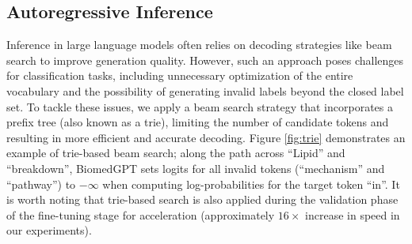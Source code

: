 \documentclass[10pt]{article} \usepackage[preprint]{tmlr}
\begin{document}
\begin{table*}
\centering
\caption{Detailed model configuration of BiomedGPT. During the pretraining phase, image processing involves resizing and cropping the images to varying resolutions, corresponding to the input sizes listed in the table. It should be noted that during fine-tuning and inference stages, the input resolution of BiomedGPT can be flexibly adjusted according to the specific requirements of the task.}
\label{tab:scaling}
\end{table*}



\subsection{Autoregressive Inference} 
Inference in large language models often relies on decoding strategies like beam search to improve generation quality. However, such an approach poses challenges for classification tasks, including unnecessary optimization of the entire vocabulary and the possibility of generating invalid labels beyond the closed label set. To tackle these issues, we apply a beam search strategy that incorporates a prefix tree (also known as a trie), limiting the number of candidate tokens and resulting in more efficient and accurate decoding. Figure \ref{fig:trie} demonstrates an example of trie-based beam search; along the path across ``Lipid'' and ``breakdown'', BiomedGPT sets logits for all invalid tokens (``mechanism'' and ``pathway'') to $-\infty$ when computing log-probabilities for the target token ``in''. It is worth noting that trie-based search is also applied during the validation phase of the fine-tuning stage for acceleration (approximately $16\times$ increase in speed in our experiments).
\end{document}

